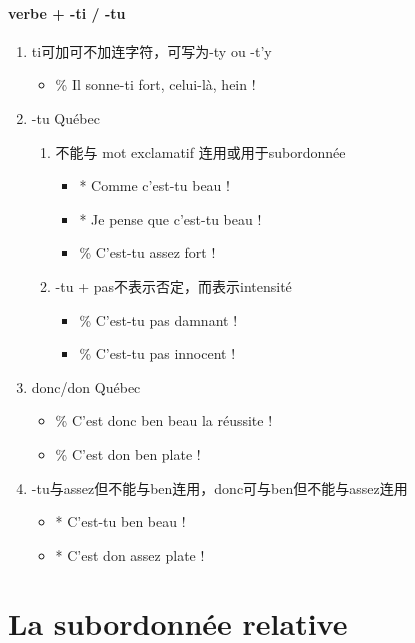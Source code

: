 \documentclass[UTF8]{report}
\begin{document}
\subsubsection{verbe + -ti / -tu}
\begin{enumerate}
    \item ti可加可不加连字符，可写为-ty ou -t’y
    \begin{itemize}
        \item \% Il sonne-ti fort, celui-là, hein ! 
    \end{itemize}
    \item -tu Québec
    \begin{enumerate}
        \item 不能与 mot exclamatif 连用或用于subordonnée
        \begin{itemize}
            \item * Comme c’est-tu beau !
            \item * Je pense que c’est-tu beau !
            \item \% C’est-tu assez fort !
        \end{itemize}
        \item -tu + pas不表示否定，而表示intensité
        \begin{itemize}
            \item \% C’est-tu pas damnant !
            \item \% C’est-tu pas innocent !
        \end{itemize}
    \end{enumerate}
    \item donc/don Québec
    \begin{itemize}
        \item \% C’est donc ben beau la réussite !
        \item \% C’est don ben plate ! 
    \end{itemize}
    \item -tu与assez但不能与ben连用，donc可与ben但不能与assez连用
    \begin{itemize}
        \item * C’est-tu ben beau !
        \item * C’est don assez plate !
    \end{itemize}
\end{enumerate}

\chapter{La subordonnée relative}
\end{document}
